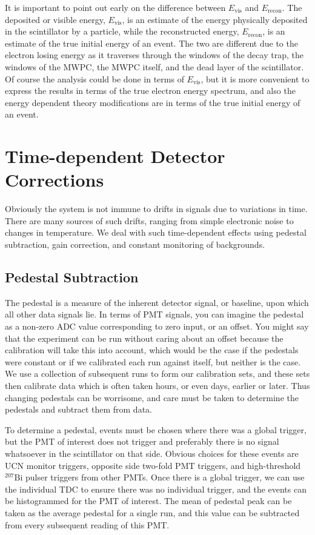 It is important to point out early on the difference between $E_{\mathrm{vis}}$ and
$E_{\mathrm{recon}}$. The deposited or visible energy, $E_{\mathrm{vis}}$, is an estimate of the energy
physically deposited in the
scintillator by a particle, while the reconstructed energy, $E_{\mathrm{recon}}$, is an estimate of
the true initial energy of an event. The two are different due to the electron losing energy
as it traverses through the windows of the decay trap, the windows of the MWPC,
the MWPC itself, and the dead layer of the scintillator. Of course the analysis could be
done in terms of $E_{\mathrm{vis}}$, but it is more convenient to express the results
in terms of the true electron energy spectrum, and also the energy dependent theory modifications
are in terms of the true initial energy of an event.




\section{Time-dependent Detector Corrections}

Obviously the system is not immune to drifts in signals due to variations
in time. There are many sources of such drifts, ranging from simple
electronic noise to changes in temperature. We deal with such time-dependent
effects using pedestal subtraction, gain correction, and constant monitoring
of backgrounds.

\subsection{Pedestal Subtraction}
The pedestal is a measure of the inherent detector signal, or baseline, 
upon which all other data signals lie. In terms of PMT signals, you can imagine 
the pedestal as a non-zero ADC value corresponding to zero input, or an offset.
You might say that the experiment can be run without caring about an offset
because the calibration will take this into account, which would be the case 
if the pedestals were constant or if we calibrated each run against itself, but 
neither is the case. We use a collection of subsequent runs to form our 
calibration sets, and these sets then calibrate data which is often taken hours,
or even days, earlier or later. Thus changing pedestals can be worrisome, and care
must be taken to determine the pedestals and subtract them from data.

To determine a pedestal, events must be chosen where there was a global trigger, but
the PMT of interest does not trigger and preferably there is no signal
whatsoever in the scintillator on that side. Obvious choices for these events are
UCN monitor triggers, opposite side two-fold PMT triggers, and high-threshold $^{207}\mathrm{Bi}$
pulser triggers from other PMTs. Once there is a global trigger, we can use the individual TDC
to ensure there was no individual trigger, and the events can be 
histogrammed for the PMT of interest. The mean of pedestal
peak can be taken as the average pedestal for a single run,
and this value can be 
subtracted from every subsequent reading of this PMT.

